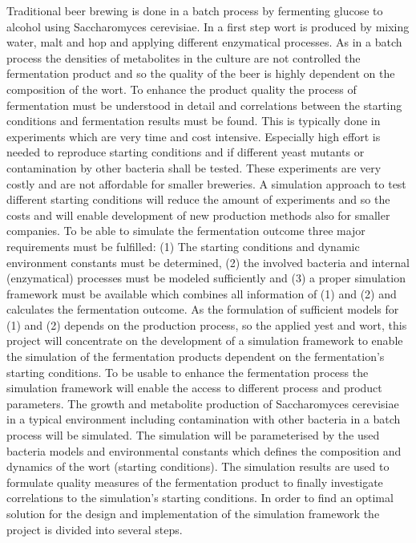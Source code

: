 Traditional beer brewing is done in a batch process by fermenting glucose to alcohol using Saccharomyces cerevisiae. In a first step wort
is produced by mixing water, malt and hop and applying different enzymatical processes. As in a batch process
the densities of metabolites in the culture are not controlled the fermentation product and so the quality of the beer is highly dependent
on the composition of the wort. To enhance the product quality the process of fermentation must be understood in detail and correlations
between the starting conditions and fermentation results must be found. This is typically done in experiments which are very time and cost
intensive. Especially high effort is needed to reproduce starting conditions and if different yeast mutants or contamination by other 
bacteria shall be tested. These experiments are very costly and are not affordable for smaller breweries. A simulation approach to test
different starting conditions will reduce the amount of experiments and so the costs and will enable development of new production methods
also for smaller companies.
To be able to simulate the fermentation outcome three major requirements must be fulfilled: (1) The starting conditions and dynamic environment
constants must be determined, (2) the involved bacteria and internal (enzymatical) processes must be modeled sufficiently and (3) a proper
simulation framework must be available which combines all information of (1) and (2) and calculates the fermentation outcome. As the 
formulation of sufficient models for (1) and (2) depends on the production process, so the applied yest and wort, this project will
concentrate on the development of a simulation framework to enable the simulation of the fermentation products dependent on the fermentation's
starting conditions.
To be usable to enhance the fermentation process the simulation framework will enable the access to different process and product parameters.
The growth and metabolite production of Saccharomyces cerevisiae in a typical environment including contamination with other bacteria in a
batch process will be simulated. The simulation will be parameterised by the used bacteria models and environmental constants which defines
the composition and dynamics of the wort (starting conditions). The simulation results are used to formulate quality measures of the fermentation
product to finally investigate correlations to the simulation's starting conditions.
In order to find an optimal solution for the design and implementation of the simulation framework the project is divided into several steps.
